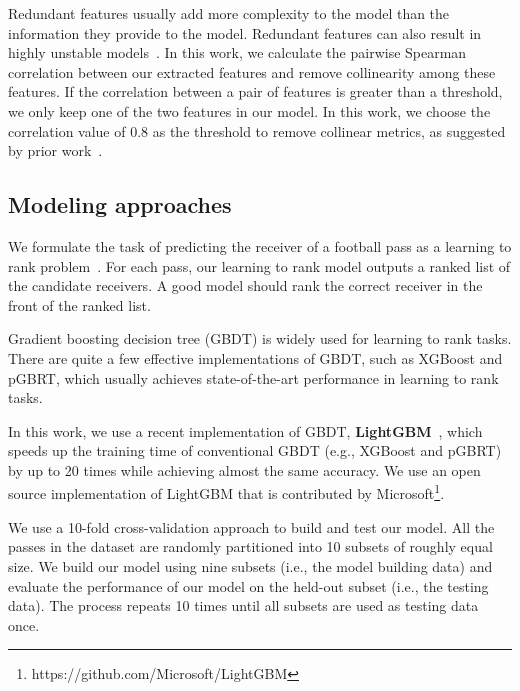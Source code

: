 Redundant features usually add more complexity to the model than the information they provide to the model. Redundant features can also result in highly unstable models~\cite{kuhn2013applied}.
In this work, we calculate the pairwise Spearman correlation between our extracted features and remove collinearity among these features.
If the correlation between a pair of features is greater than a threshold, we only keep one of the two features in our model.
In this work, we choose the correlation value of 0.8 as the threshold to remove collinear metrics, as suggested by prior work~\cite{kuhn2013applied}.

\subsection{Modeling approaches}

We formulate the task of predicting the receiver of a football pass as a learning to rank problem~\cite{liu2009learning}. 
For each pass, our learning to rank model outputs a ranked list of the candidate receivers. 
A good model should rank the correct receiver in the front of the ranked list.

Gradient boosting decision tree (GBDT) is widely used for learning to rank tasks.
There are quite a few effective implementations of GBDT, such as XGBoost and pGBRT, which usually achieves state-of-the-art performance in learning to rank tasks.

In this work, we use a recent implementation of GBDT, \textbf{LightGBM}~\cite{NIPS2017_6907}, which speeds up the training time of conventional GBDT (e.g., XGBoost and pGBRT) by up to 20 times while achieving almost the same accuracy. 
We use an open source implementation of LightGBM that is contributed by Microsoft\footnote{https://github.com/Microsoft/LightGBM}.

We use a 10-fold cross-validation approach to build and test our model. 
All the passes in the dataset are randomly partitioned into 10 subsets of roughly equal size. 
We build our model using nine subsets (i.e., the model building data) and evaluate the performance of our model on the held-out subset (i.e., the testing data).
The process repeats 10 times until all subsets are used as testing data once.

